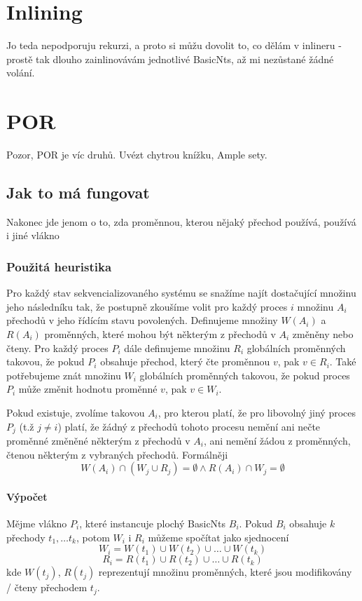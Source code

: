 \documentclass[10pt,a4paper,notitlepage]{report}
\begin{document}
\section{Inlining}
Jo teda nepodporuju rekurzi, a proto si můžu dovolit to, co dělám v inlineru - prostě tak dlouho zainlinovávám jednotlivé BasicNts, až mi nezůstané žádné volání.

\section{POR}
Pozor, POR je víc druhů. Uvézt chytrou knížku, Ample sety.
\subsection{Jak to má fungovat}
Nakonec jde jenom o to, zda proměnnou, kterou nějaký přechod používá, používá i jiné vlákno

\subsubsection{Použitá heuristika}
Pro každý stav sekvencializovaného systému se snažíme najít dostačující množinu jeho následníku tak, že postupně zkoušíme volit pro každý proces $i$ množinu $A_i$ přechodů v jeho řídícím stavu povolených. Definujeme množiny $W(A_i)$ a $R(A_i)$ proměnných, které mohou být některým z přechodů v $A_i$ změněny nebo čteny. Pro každý proces $P_i$ dále definujeme množinu $R_i$ globálních proměnných takovou, že pokud $P_i$ obsahuje přechod, který čte proměnnou $v$, pak $v \in R_i$. Také potřebujeme znát množinu $W_i$ globálních proměnných takovou, že pokud proces $P_i$ může změnit hodnotu proměnné $v$, pak $v \in W_i$.

Pokud existuje, zvolíme takovou $A_i$, pro kterou platí, že pro libovolný jiný proces $P_j$ (t.ž $j \neq i$) platí, že žádný z přechodů tohoto procesu nemění ani nečte proměnné změněné některým z přechodů v $A_i$, ani  nemění žádou z proměnných, čtenou některým z vybraných přechodů. Formálněji
\begin{equation}
W(A_i) \cap (W_j \cup R_j) = \emptyset \land R(A_i) \cap W_j = \emptyset
\end{equation}


\paragraph{Výpočet}
Mějme vlákno $P_i$, které instancuje plochý BasicNts $B_i$. Pokud $B_i$ obsahuje $k$ přechody $t_1, \ldots t_k$, potom $W_i$ i $R_i$ můžeme spočítat jako sjednocení
\begin{equation}
W_i = W(t_1) \cup W(t_2) \cup \ldots \cup W(t_k)
\end{equation}
\begin{equation}
R_i = R(t_1) \cup R(t_2) \cup \ldots \cup R(t_k)
\end{equation}
kde $W(t_j)$, $R(t_j)$ reprezentují množinu proměnných, které jsou modifikovány / čteny přechodem $t_j$.
\end{document}
